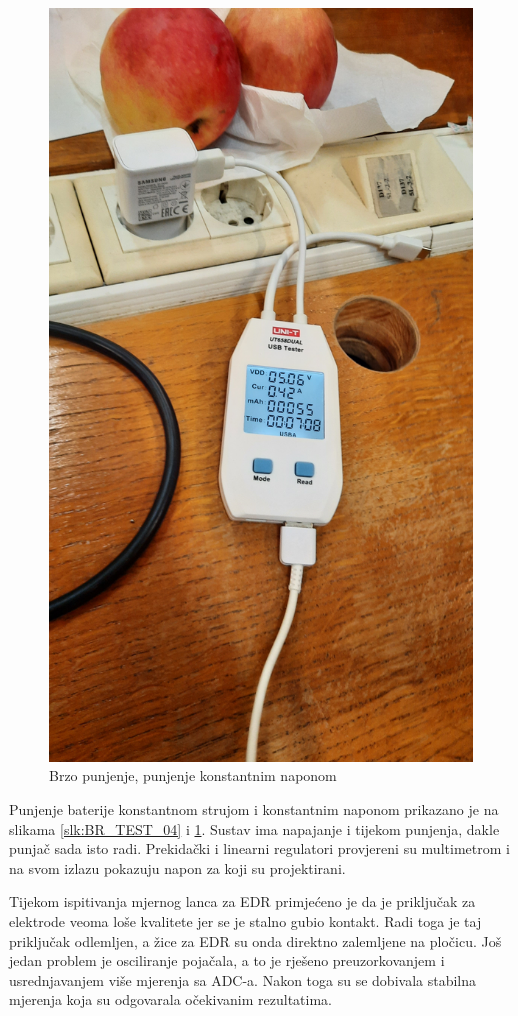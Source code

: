 \begin{figure}[htb]
    \centering
    \includegraphics[width=10 cm]{Figures/BR_TEST_03.jpg}
    \caption{Brzo punjenje, punjenje konstantnim naponom}
    \label{slk:BR_TEST_03}
\end{figure}
Punjenje baterije konstantnom strujom i konstantnim naponom prikazano je na slikama \ref{slk:BR_TEST_04} i \ref{slk:BR_TEST_03}. Sustav ima napajanje i tijekom punjenja, dakle punjač sada isto radi. Prekidački i linearni regulatori provjereni su multimetrom i na svom izlazu pokazuju napon za koji su projektirani.

Tijekom ispitivanja mjernog lanca za EDR primjećeno je da je priključak za elektrode veoma loše kvalitete jer se je stalno gubio kontakt. Radi toga je taj priključak odlemljen, a žice za EDR su onda direktno zalemljene na pločicu. Još jedan problem je osciliranje pojačala, a to je rješeno preuzorkovanjem i usrednjavanjem više mjerenja sa ADC-a. Nakon toga su se dobivala stabilna mjerenja koja su odgovarala očekivanim rezultatima.

